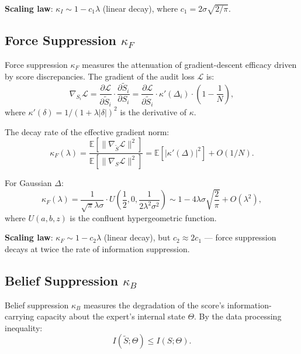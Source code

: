 \documentclass[12pt,a4paper]{article}
\theoremstyle{definition}
\newcommand{\E}{\mathbb{E}}
\begin{document}
\textbf{Scaling law}: $\kappa_I \sim 1 - c_1\lambda$ (linear decay), where $c_1 = 2\sigma\sqrt{2/\pi}$.

\subsection{Force Suppression $\kappa_F$}

Force suppression $\kappa_F$ measures the attenuation of gradient-descent efficacy driven by score discrepancies. The gradient of the audit loss $\mathcal{L}$ is:
\begin{equation}
    \nabla_{S_i}\mathcal{L} = \frac{\partial\mathcal{L}}{\partial \tilde{S}_i} \cdot \frac{\partial\tilde{S}_i}{\partial S_i} = \frac{\partial\mathcal{L}}{\partial \tilde{S}_i} \cdot \kappa'(\Delta_i) \cdot \left(1 - \frac{1}{N}\right),
\end{equation}
where $\kappa'(\delta) = 1/(1+\lambda|\delta|)^2$ is the derivative of $\kappa$.

The decay rate of the effective gradient norm:
\begin{equation}
    \kappa_F(\lambda) = \frac{\E[\|\nabla_{\tilde{S}}\mathcal{L}\|^2]}{\E[\|\nabla_S\mathcal{L}\|^2]} = \E[|\kappa'(\Delta)|^2] + O(1/N).
\end{equation}

For Gaussian $\Delta$:
\begin{equation}
    \kappa_F(\lambda) = \frac{1}{\sqrt{\pi}\lambda\sigma} \cdot U\left(\frac{1}{2}, 0, \frac{1}{2\lambda^2\sigma^2}\right) \sim 1 - 4\lambda\sigma\sqrt{\frac{2}{\pi}} + O(\lambda^2),
\end{equation}
where $U(a,b,z)$ is the confluent hypergeometric function.

\textbf{Scaling law}: $\kappa_F \sim 1 - c_2\lambda$ (linear decay), but $c_2 \approx 2c_1$ --- force suppression decays at twice the rate of information suppression.

\subsection{Belief Suppression $\kappa_B$}

Belief suppression $\kappa_B$ measures the degradation of the score's information-carrying capacity about the expert's internal state $\Theta$. By the data processing inequality:
\begin{equation}
    I(\tilde{S}; \Theta) \leq I(S; \Theta).
\end{equation}
\end{document}
